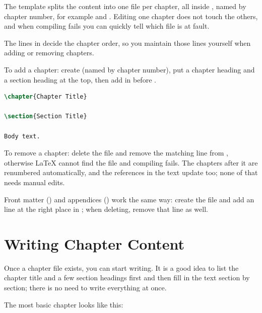 The template splits the content into one file per chapter, all inside , named by chapter number, for example  and . Editing one chapter does not touch the others, and when compiling fails you can quickly tell which file is at fault.

The \code{} lines in  decide the chapter order, so you maintain those lines yourself when adding or removing chapters.

To add a chapter: create  (named by chapter number), put a chapter heading and a section heading at the top, then add \code{} in  before .

\begin{lstlisting}[language=latex]
\chapter{Chapter Title}

\section{Section Title}

Body text.
\end{lstlisting}

To remove a chapter: delete the file and remove the matching \code{} line from , otherwise \LaTeX{} cannot find the file and compiling fails. The chapters after it are renumbered automatically, and the \code{\ref} references in the text update too; none of that needs manual edits.

Front matter () and appendices () work the same way: create the file and add an \code{} line at the right place in ; when deleting, remove that line as well.

\section{Writing Chapter Content}

Once a chapter file exists, you can start writing. It is a good idea to list the chapter title and a few section headings first and then fill in the text section by section; there is no need to write everything at once.

The most basic chapter looks like this:

